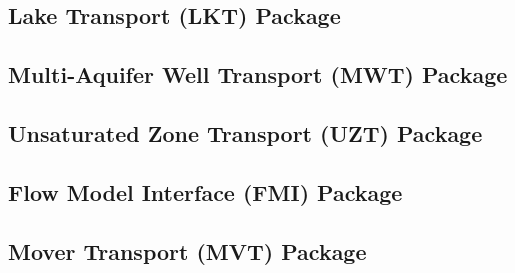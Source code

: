 \newpage
\subsection{Lake Transport (LKT) Package}


\newpage
\subsection{Multi-Aquifer Well Transport (MWT) Package}


\newpage
\subsection{Unsaturated Zone Transport (UZT) Package}


\newpage
\subsection{Flow Model Interface (FMI) Package}


\newpage
\subsection{Mover Transport (MVT) Package}


